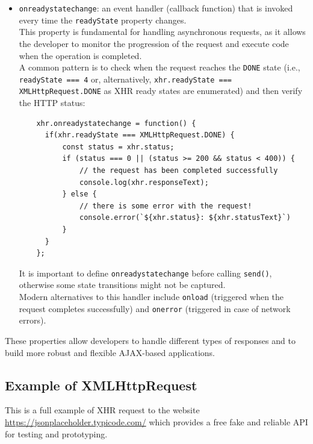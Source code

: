 \documentclass{scrbook}
\begin{document}
\begin{itemize}
		\item \texttt{onreadystatechange}: an event handler (callback function) that is invoked every time the \texttt{readyState} property changes.\\
		
		This property is fundamental for handling asynchronous requests, as it allows the developer to monitor the progression of the request and execute code when the operation is completed.\\
		
		A common pattern is to check when the request reaches the \texttt{DONE} state (i.e., \texttt{readyState === 4} or, alternatively, \texttt{xhr.readyState === XMLHttpRequest.DONE} as XHR ready states are enumerated) and then verify the HTTP status:
		
		\begin{lstlisting}
	xhr.onreadystatechange = function() {
	  if(xhr.readyState === XMLHttpRequest.DONE) {
		  const status = xhr.status;
		  if (status === 0 || (status >= 200 && status < 400)) {
			  // the request has been completed successfully
			  console.log(xhr.responseText);
		  } else {
			  // there is some error with the request!
			  console.error(`${xhr.status}: ${xhr.statusText}`)
		  }
	  }
	};
		\end{lstlisting}
		
		It is important to define \texttt{onreadystatechange} before calling \texttt{send()}, otherwise some state transitions might not be captured.\\
		
		Modern alternatives to this handler include \texttt{onload} (triggered when the request completes successfully) and \texttt{onerror} (triggered in case of network errors).
	\end{itemize}
		
	These properties allow developers to handle different types of responses and to build more robust and flexible AJAX-based applications.
	
	\subsection{Example of XMLHttpRequest}
	
	This is a full example of XHR request to the website \hyperlink{https://jsonplaceholder.typicode.com/}{https://jsonplaceholder.typicode.com/} which provides a free fake and reliable API for testing and prototyping.\\
	
\end{document}
